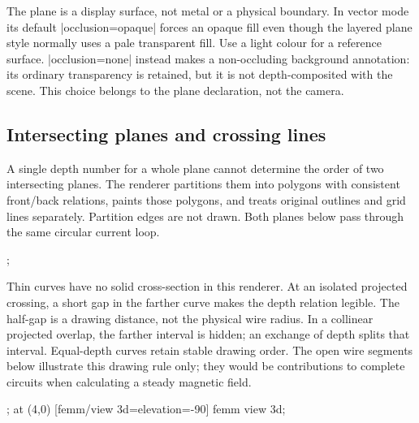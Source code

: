 The plane is a display surface, not metal or a physical boundary. In vector
mode its default |occlusion=opaque| forces an opaque fill even though the
layered plane style normally uses a pale transparent fill. Use a light colour
for a reference surface. |occlusion=none| instead makes a non-occluding background
annotation: its ordinary transparency is retained, but it is not depth-composited
with the scene. This choice belongs to the plane declaration, not the camera.

\subsection{Intersecting planes and crossing lines}
A single depth number for a whole plane cannot determine the order of two
intersecting planes. The renderer partitions them into polygons with consistent
front/back relations, paints those polygons, and treats original outlines and
grid lines separately. Partition edges are not drawn. Both planes below pass
through the same circular current loop.
\begin{codeexample}[width=0pt]
\begingroup
{}
 \femmbiotsource[current=1,radius=1.2]
 \femmbiotscene[name=intersecting-planes,field=false]
\endtikzpicture
\femmviewplane[scene=intersecting-planes,plane=custom,
 u=1/0/.7,v=0/1/0,umin=-1,umax=1,vmin=-1,vmax=1,
 grid=major,step=.5,style={fill=blue!15},label={$P$}]
\femmviewplane[scene=intersecting-planes,plane=custom,
 u=1/0/-.7,v=0/1/0,umin=-1,umax=1,vmin=-1,vmax=1,
 grid=major,step=.5,style={fill=green!15},label={$Q$}]
\tikzpicture[femm/view 3d={scene=intersecting-planes,
 visibility=vector,hidden=dashed,axes=none,
 azimuth=-25,elevation=40,coordinate scale=1.2,
 xmin=-1.5,xmax=1.5,ymin=-1.5,ymax=1.5,zmin=-1,zmax=1},
 femm 3d hidden/.append style={draw opacity=.45}]
 ;
\endtikzpicture
{}
\endgroup
\end{codeexample}

Thin curves have no solid cross-section in this renderer. At an isolated
projected crossing, a short gap in the farther curve makes the depth relation
legible. The half-gap is a drawing distance, not the physical wire radius. In
a collinear projected overlap, the farther interval is hidden; an exchange of
depth splits that interval. Equal-depth curves retain stable drawing order.
The open wire segments below illustrate this drawing rule only; they would be
contributions to complete circuits when calculating a steady magnetic field.
\begin{codeexample}[width=0pt]
\begingroup
{}
 \femmbiotsource[kind=wire,closure=contribution,current=1,
  from=-1/0/-1,to=1/0/-1]
 \femmbiotsource[kind=wire,closure=contribution,current=1,
  from=0/-1/1,to=0/1/1]
 \femmbiotscene[name=crossing-wires,field=false]
\endtikzpicture
\tikzpicture[femm/view 3d={scene=crossing-wires,
 visibility=vector,axes=triad,azimuth=0,elevation=90,
 crossing gap=.1,xmin=-1.2,xmax=1.2,ymin=-1.2,ymax=1.2,
 zmin=-1.2,zmax=1.2}]
 ;
 \pic at (4,0) [femm/view 3d={elevation=-90}]
  {femm view 3d};
\endtikzpicture
{}
\endgroup
\end{codeexample}

